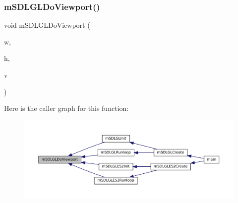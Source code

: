 \subsubsection{\texorpdfstring{m\+S\+D\+L\+G\+L\+Do\+Viewport()}{mSDLGLDoViewport()}}
{\footnotesize\ttfamily void m\+S\+D\+L\+G\+L\+Do\+Viewport (\begin{DoxyParamCaption}\item[{\mbox{\hyperlink{ioapi_8h_a787fa3cf048117ba7123753c1e74fcd6}{int}}}]{w,  }\item[{\mbox{\hyperlink{ioapi_8h_a787fa3cf048117ba7123753c1e74fcd6}{int}}}]{h,  }\item[{struct \mbox{\hyperlink{struct_video_backend}{Video\+Backend}} $\ast$}]{v }\end{DoxyParamCaption})}

Here is the caller graph for this function\+:
\nopagebreak
\begin{figure}[H]
\begin{center}
\leavevmode
\includegraphics[width=350pt]{gl-common_8c_a3bdc1ec0c721ec01a7acf856d6370dd3_icgraph}
\end{center}
\end{figure}
